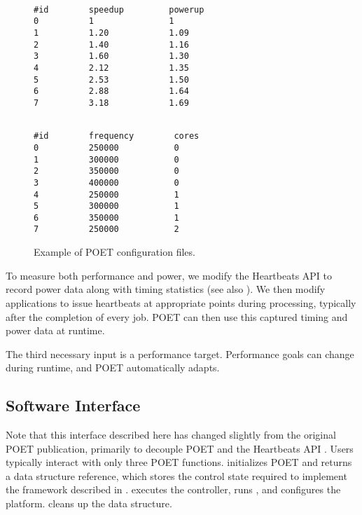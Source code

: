 \begin{figure}[t]
\centering
\begin{minipage}{.45\columnwidth}
\lstset{
  belowskip=0pt,
  aboveskip=0pt,
}
\begin{lstlisting}[frame=tlr,%
  caption={System-agnostic.},%
  label={lst:control_config_example}]%

#id        speedup         powerup
0          1               1
1          1.20            1.09
2          1.40            1.16
3          1.60            1.30
4          2.12            1.35
5          2.53            1.50
6          2.88            1.64
7          3.18            1.69
\end{lstlisting}
\end{minipage}
\hspace*{0.4cm}
\begin{minipage}{.45\columnwidth}
\lstset{
  belowskip=0pt,
  aboveskip=0pt,
}
\begin{lstlisting}[frame=tlr,%
  caption={System-specific.},%
  label={lst:cpu_config_example}]%

#id        frequency        cores
0          250000           0
1          300000           0
2          350000           0
3          400000           0
4          250000           1
5          300000           1
6          350000           1
7          250000           2
\end{lstlisting}
\end{minipage}
\caption{Example of POET configuration files.}
\label{fig:config-examples}
\end{figure}

To measure both performance and power, we modify the Heartbeats API \cite{PTRADE} to record power data along with timing statistics (see also ).
We then modify applications to issue heartbeats at appropriate points during processing, typically after the completion of every job.
POET can then use this captured timing and power data at runtime.

The third necessary input is a performance target.
Performance goals can change during runtime, and POET automatically adapts.


\subsection{Software Interface}
\label{sec:poet-interface}

Note that this interface described here has changed slightly from the original POET publication, primarily to decouple POET and the Heartbeats API \cite{POET}.
Users typically interact with only three POET functions.
 initializes POET and returns a  data structure reference, which stores the control state required to implement the framework described in .
 executes the controller, runs , and configures the platform.
 cleans up the  data structure.

